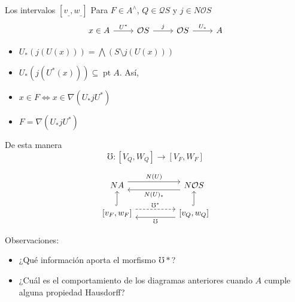 \documentclass[compress,12pt]{beamer}
\DeclareMathOperator{\pt}{pt}
\begin{document}
	\begin{frame}[fragile]{Los intervalos $[v_{\_}, w_{\_}]$}
		Para $F\in A^\wedge$, $Q\in \mathcal{Q}S$ y $j\in N\mathcal{O}S$ 
		\[\begin{tikzcd}
			x\in A & {\mathcal{O}S} & {\mathcal{O}S} & A
			\arrow["{U^*}", from=1-1, to=1-2]
			\arrow["j", from=1-2, to=1-3]
			\arrow["{U_*}", from=1-3, to=1-4]
		\end{tikzcd}\]

		\begin{itemize}
		\item<2-> $U_*(j(U(x)))=\bigwedge(S\setminus j(U(x)))$
		\item<3-> $U_*(j(U^*(x)))\subseteq \pt A$. Así,
		\item<4-> $x\in F \Leftrightarrow  x\in \nabla(U_*jU^*)$
        \item<5-> $F=\nabla(U_*jU^*)$
	\end{itemize}

	\end{frame}

	\begin{frame}[fragile]
		De esta manera
\[
\mho\colon [V_Q, W_Q]\to [V_F, W_F]
\]

\[\begin{tikzcd}
	NA && {N\mathcal{O}S} \\
	{[v_F, w_F]} && {[v_Q, w_Q]}
	\arrow["{N(U)}", shift left=2, from=1-1, to=1-3]
	\arrow["{N(U)_*}", shift left=2, from=1-3, to=1-1]
	\arrow[hook, from=2-1, to=1-1]
	\arrow["\mho^*", shift left=2, dashed, from=2-1, to=2-3]
	\arrow[hook, from=2-3, to=1-3]
	\arrow["\mho", shift left=2, from=2-3, to=2-1]
\end{tikzcd}\]

\begin{block}{Observaciones:}
\begin{itemize}
\item<2-> ¿Qué información aporta el morfismo $\mho*$?
\item<3-> ¿Cuál es el comportamiento de los diagramas anteriores cuando $A$ cumple alguna propiedad Hausdorff?
\end{itemize}
\end{block}
	\end{frame}
\End
\end{document}
